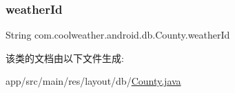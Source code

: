 \subsubsection{\texorpdfstring{weatherId}{weatherId}}
{\footnotesize\ttfamily String com.\+coolweather.\+android.\+db.\+County.\+weather\+Id\hspace{0.3cm}{\ttfamily [private]}}



该类的文档由以下文件生成\+:\begin{DoxyCompactItemize}
\item 
app/src/main/res/layout/db/\mbox{\hyperlink{res_2layout_2db_2_county_8java}{County.\+java}}\end{DoxyCompactItemize}
